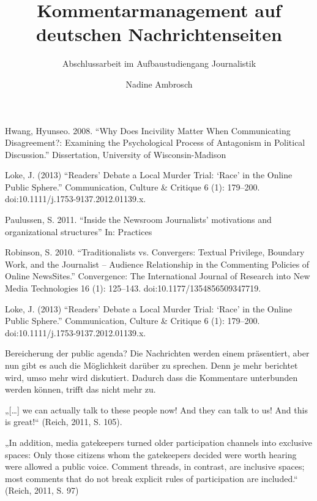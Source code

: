 \documentclass[12pt,parskip=full]{scrreprt} %
\title{Kommentarmanagement auf deutschen Nachrichtenseiten}
\subtitle{Abschlussarbeit im Aufbaustudiengang Journalistik}
\author{Nadine Ambrosch}
\begin{document}
\begin{spacing}{1}
  \maketitle
\end{spacing}

\tableofcontents
\listoftables



















Hwang, Hyunseo. 2008. “Why Does Incivility Matter When Communicating Disagreement?:
Examining the Psychological Process of Antagonism in Political Discussion.” Dissertation,
University of Wisconsin-Madison

Loke, J. (2013) “Readers’ Debate a Local Murder Trial: ‘Race’ in the Online
Public Sphere.” Communication, Culture \& Critique 6 (1): 179–200.
doi:10.1111/j.1753-9137.2012.01139.x.

Paulussen, S. 2011. ``Inside the Newsroom Journalists’ motivations and organizational structures'' In: Practices


Robinson, S. 2010. “Traditionalists vs. Convergers: Textual Privilege, Boundary Work, and the
Journalist – Audience Relationship in the Commenting Policies of Online NewsSites.”
Convergence: The International Journal of Research into New Media Technologies 16 (1):
125–143. doi:10.1177/1354856509347719.

Loke, J. (2013) “Readers’ Debate a Local Murder Trial: ‘Race’ in the Online
Public Sphere.” Communication, Culture \& Critique 6 (1): 179–200.
doi:10.1111/j.1753-9137.2012.01139.x.



Bereicherung der public agenda? Die Nachrichten werden einem präsentiert, aber
nun gibt es auch die Möglichkeit darüber zu sprechen. Denn je mehr berichtet
wird, umso mehr wird diskutiert. Dadurch dass die Kommentare unterbunden werden
können, trifft das nicht mehr zu.

 

„[\ldots] we can actually talk to these people now! And they can talk to us! And
this is great!“ (Reich, 2011, S. 105).

„In addition, media gatekeepers  turned older participation channels into
exclusive spaces: Only those citizens whom the gatekeepers decided were
worth hearing were allowed a public voice. Comment threads, in contrast,
are inclusive spaces; most comments that do not break explicit rules of
participation are included.“ (Reich, 2011, S. 97)
\end{document}
